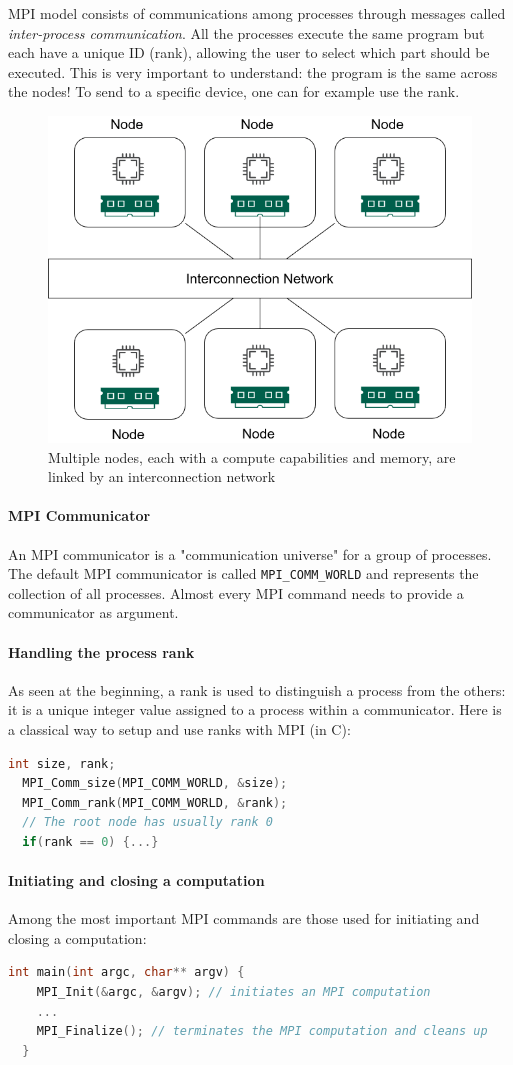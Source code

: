 \documentclass{article}
\begin{document}
MPI model consists of communications among processes through messages called \textit{inter-process communication}. All the processes execute the same program but each have a unique ID (rank), allowing the user to select which part should be executed. This is very important to understand: the program is the same across the nodes! To send to a specific device, one can for example use the rank.

\begin{figure}[h!]
  \center
  \includegraphics[width=0.5\linewidth]{images/2022-08-25-11-00-37.png}
  \caption{Multiple nodes, each with a compute capabilities and memory, are linked by an interconnection network}
\end{figure}
\FloatBarrier

\paragraph{MPI Communicator}
An MPI communicator is a "communication universe" for a group of processes. The default MPI communicator is called \lstinline{MPI_COMM_WORLD} and represents the collection of all processes. Almost every MPI command needs to provide a communicator as argument.

\paragraph{Handling the process rank}
As seen at the beginning, a rank is used to distinguish a process from the others: it is a unique integer value assigned to a process within a communicator. Here is a classical way to setup and use ranks with MPI (in C):
\begin{lstlisting}[language=C]
  int size, rank;
  MPI_Comm_size(MPI_COMM_WORLD, &size);
  MPI_Comm_rank(MPI_COMM_WORLD, &rank);
  // The root node has usually rank 0
  if(rank == 0) {...}
\end{lstlisting}

\paragraph{Initiating and closing a computation}
Among the most important MPI commands are those used for initiating and closing a computation:
\begin{lstlisting}[language=C]
  int main(int argc, char** argv) {
    MPI_Init(&argc, &argv); // initiates an MPI computation
    ...
    MPI_Finalize(); // terminates the MPI computation and cleans up
  }
\end{lstlisting}
\end{document}
